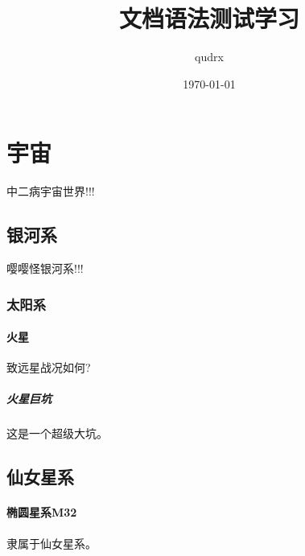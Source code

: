 \documentclass[UTF8,20pt]{ctexart}
\title{文档语法测试学习}
\author{qudrx}
\date{\today}
\begin{document}
\maketitle
\section{宇宙}
中二病宇宙世界!!!
\subsection{银河系}
嘤嘤怪银河系!!!
\subsubsection{太阳系}
\paragraph{火星}
致远星战况如何?
\subparagraph{火星巨坑}
这是一个超级大坑。
\subsection{仙女星系}
\paragraph{椭圆星系M32} 隶属于仙女星系。
\end{document}
